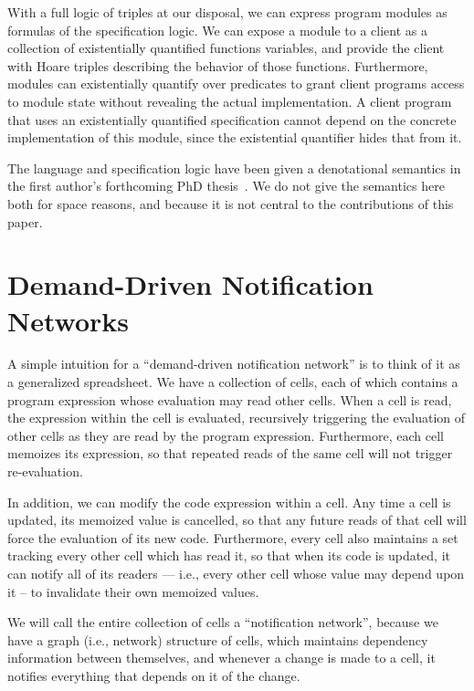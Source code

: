 \documentclass[preprint,natbib]{sigplanconf}
\begin{document}
With a full logic of triples at our disposal, we can express program
modules as formulas of the specification logic. We can expose a module
to a client as a collection of existentially quantified functions
variables, and provide the client with Hoare triples describing the
behavior of those functions. Furthermore, modules can existentially
quantify over predicates to grant client programs access to module
state without revealing the actual implementation. A client program
that uses an existentially quantified specification cannot depend on
the concrete implementation of this module, since the existential
quantifier hides that from it.

The language and specification logic have been given a denotational
semantics in the first author's forthcoming PhD
thesis~\cite{tech-report}. We do not give the semantics here both for
space reasons, and because it is not central to the contributions of
this paper. 

\section{Demand-Driven Notification Networks}

A simple intuition for a ``demand-driven notification network'' is to
think of it as a generalized spreadsheet. We have a collection of
cells, each of which contains a program expression whose evaluation may
read other cells. When a cell is read, the expression within the
cell is evaluated, recursively triggering the evaluation of other
cells as they are read by the program expression. Furthermore, each
cell memoizes its expression, so that repeated reads of the same cell
will not trigger re-evaluation.

In addition, we can modify the code expression within a cell.  Any
time a cell is updated, its memoized value is cancelled, so that any
future reads of that cell will force the evaluation of its new
code. Furthermore, every cell also maintains a set tracking every
other cell which has read it, so that when its code is updated, it can
notify all of its readers --- i.e., every other cell whose value may
depend upon it -- to invalidate their own memoized values. 

We will call the entire collection of cells a ``notification
network'', because we have a graph (i.e., network) structure of cells,
which maintains dependency information between themselves, and
whenever a change is made to a cell, it notifies everything that
depends on it of the change.
\end{document}
